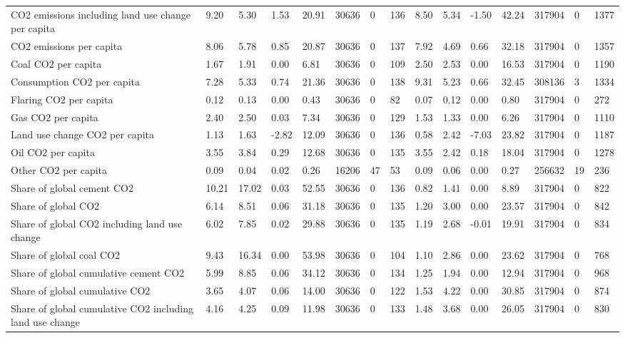 \begin{longtable}{lllllllllllllll}
CO2 emissions including land use change per capita & 9.20 & 5.30 & 1.53 & 20.91 & 30636 & 0 & 136 & 8.50 & 5.34 & -1.50 & 42.24 & 317904 & 0 & 1377\\
CO2 emissions per capita & 8.06 & 5.78 & 0.85 & 20.87 & 30636 & 0 & 137 & 7.92 & 4.69 & 0.66 & 32.18 & 317904 & 0 & 1357\\
Coal CO2 per capita & 1.67 & 1.91 & 0.00 & 6.81 & 30636 & 0 & 109 & 2.50 & 2.53 & 0.00 & 16.53 & 317904 & 0 & 1190\\
Consumption CO2 per capita & 7.28 & 5.33 & 0.74 & 21.36 & 30636 & 0 & 138 & 9.31 & 5.23 & 0.66 & 32.45 & 308136 & 3 & 1334\\
\addlinespace
Flaring CO2 per capita & 0.12 & 0.13 & 0.00 & 0.43 & 30636 & 0 & 82 & 0.07 & 0.12 & 0.00 & 0.80 & 317904 & 0 & 272\\
Gas CO2 per capita & 2.40 & 2.50 & 0.03 & 7.34 & 30636 & 0 & 129 & 1.53 & 1.33 & 0.00 & 6.26 & 317904 & 0 & 1110\\
Land use change CO2 per capita & 1.13 & 1.63 & -2.82 & 12.09 & 30636 & 0 & 136 & 0.58 & 2.42 & -7.03 & 23.82 & 317904 & 0 & 1187\\
Oil CO2 per capita & 3.55 & 3.84 & 0.29 & 12.68 & 30636 & 0 & 135 & 3.55 & 2.42 & 0.18 & 18.04 & 317904 & 0 & 1278\\
Other CO2 per capita & 0.09 & 0.04 & 0.02 & 0.26 & 16206 & 47 & 53 & 0.09 & 0.06 & 0.00 & 0.27 & 256632 & 19 & 236\\
\addlinespace
Share of global cement CO2 & 10.21 & 17.02 & 0.03 & 52.55 & 30636 & 0 & 136 & 0.82 & 1.41 & 0.00 & 8.89 & 317904 & 0 & 822\\
Share of global CO2 & 6.14 & 8.51 & 0.06 & 31.18 & 30636 & 0 & 135 & 1.20 & 3.00 & 0.00 & 23.57 & 317904 & 0 & 842\\
Share of global CO2 including land use change & 6.02 & 7.85 & 0.02 & 29.88 & 30636 & 0 & 135 & 1.19 & 2.68 & -0.01 & 19.91 & 317904 & 0 & 834\\
Share of global coal CO2 & 9.43 & 16.34 & 0.00 & 53.98 & 30636 & 0 & 104 & 1.10 & 2.86 & 0.00 & 23.62 & 317904 & 0 & 768\\
Share of global cumulative cement CO2 & 5.99 & 8.85 & 0.06 & 34.12 & 30636 & 0 & 134 & 1.25 & 1.94 & 0.00 & 12.94 & 317904 & 0 & 968\\
\addlinespace
Share of global cumulative CO2 & 3.65 & 4.07 & 0.06 & 14.00 & 30636 & 0 & 122 & 1.53 & 4.22 & 0.00 & 30.85 & 317904 & 0 & 874\\
Share of global cumulative CO2 including land use change & 4.16 & 4.25 & 0.09 & 11.98 & 30636 & 0 & 133 & 1.48 & 3.68 & 0.00 & 26.05 & 317904 & 0 & 830\\

\end{longtable}
